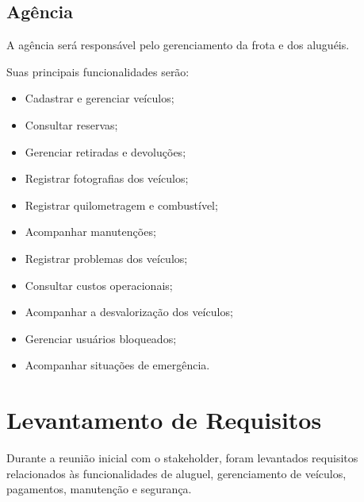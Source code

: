\documentclass[12pt,a4paper]{report}
\begin{document}
\section{Agência}

A agência será responsável pelo gerenciamento da frota e dos
aluguéis.

Suas principais funcionalidades serão:

\begin{itemize}

    \item Cadastrar e gerenciar veículos;
    \item Consultar reservas;
    \item Gerenciar retiradas e devoluções;
    \item Registrar fotografias dos veículos;
    \item Registrar quilometragem e combustível;
    \item Acompanhar manutenções;
    \item Registrar problemas dos veículos;
    \item Consultar custos operacionais;
    \item Acompanhar a desvalorização dos veículos;
    \item Gerenciar usuários bloqueados;
    \item Acompanhar situações de emergência.

\end{itemize}


\chapter{Levantamento de Requisitos}

Durante a reunião inicial com o stakeholder, foram levantados
requisitos relacionados às funcionalidades de aluguel,
gerenciamento de veículos, pagamentos, manutenção e segurança.
\end{document}
